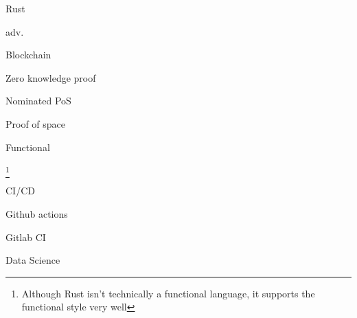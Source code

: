 \documentclass{CurriculumVitae}[10pt, condensed]
\begin{document}
  \begin{multicols}{4}

    \begin{skills}{Rust}
    \item adv.~
    \item {}
    \item {}
    \item {}
    \item {}
    \item {}
    \item {}
    \end{skills}

    \begin{skills}{Blockchain}
    \item {}
    \item {}
    \item {}
    \item Zero knowledge proof
    \item Nominated PoS
    \item Proof of space
    \item {}
    \end{skills}

    \begin{skills}{Functional}
    \item {}
    \item {}\footnote{Although Rust isn't technically a functional language, it supports the functional style very well}
    \item {}
    \item {}
    \end{skills}

    \begin{skills}{CI/CD}
    \item Github actions
    \item {}
    \item Gitlab CI
    \end{skills}


    \begin{skills}{Data Science}
    \item {}
    \item {}
    \item {}
    \item {}
    \item {}
    \item {}
    \item {}
    \end{skills}


\end{multicols}
\end{document}
